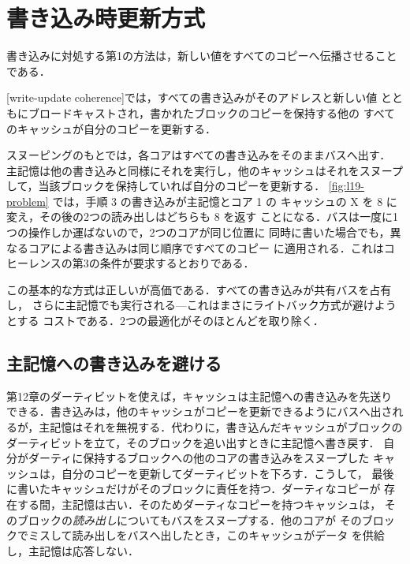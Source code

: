 \documentclass[../main.tex]{subfiles}
\begin{document}
\section{書き込み時更新方式}
\label{sec:l19-write-update}

書き込みに対処する第1の方法は，新しい値をすべてのコピーへ伝播させること
である．

\begin{definition}[書き込み時更新方式]
  [write-update coherence]では，すべての書き込みがそのアドレスと新しい値
  とともにブロードキャストされ，書かれたブロックのコピーを保持する他の
  すべてのキャッシュが自分のコピーを更新する．
\end{definition}

スヌーピングのもとでは，各コアはすべての書き込みをそのままバスへ出す．
主記憶は他の書き込みと同様にそれを実行し，他のキャッシュはそれをスヌープ
して，当該ブロックを保持していれば自分のコピーを更新する．
\cref{fig:l19-problem} では，手順 3 の書き込みが主記憶とコア 1 の
キャッシュの X を 8 に変え，その後の2つの読み出しはどちらも 8 を返す
ことになる．バスは一度に1つの操作しか運ばないので，2つのコアが同じ位置に
同時に書いた場合でも，異なるコアによる書き込みは同じ順序ですべてのコピー
に適用される．これはコヒーレンスの第3の条件が要求するとおりである．

この基本的な方式は正しいが高価である．すべての書き込みが共有バスを占有し，
さらに主記憶でも実行される---これはまさにライトバック方式が避けようとする
コストである．2つの最適化がそのほとんどを取り除く．

\subsection{主記憶への書き込みを避ける}

第12章のダーティビットを使えば，キャッシュは主記憶への書き込みを先送り
できる．書き込みは，他のキャッシュがコピーを更新できるようにバスへ出され
るが，主記憶はそれを無視する．代わりに，書き込んだキャッシュがブロックの
ダーティビットを立て，そのブロックを追い出すときに主記憶へ書き戻す．
自分がダーティに保持するブロックへの他のコアの書き込みをスヌープした
キャッシュは，自分のコピーを更新してダーティビットを下ろす．こうして，
最後に書いたキャッシュだけがそのブロックに責任を持つ．ダーティなコピーが
存在する間，主記憶は古い．そのためダーティなコピーを持つキャッシュは，
そのブロックの\emph{読み出し}についてもバスをスヌープする．他のコアが
そのブロックでミスして読み出しをバスへ出したとき，このキャッシュがデータ
を供給し，主記憶は応答しない．
\end{document}
